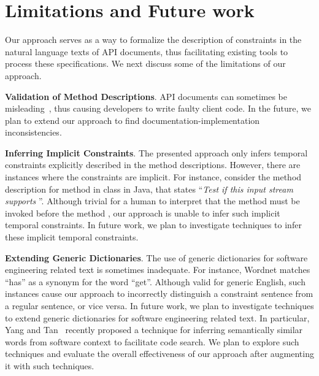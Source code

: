 \section{Limitations and Future work}
\label{sec:discussion}
\vspace*{-1ex}
Our approach serves as a way to formalize the description of constraints in the natural language texts of API documents, thus facilitating existing tools to process these specifications. We next discuss some of the limitations of our approach.

\textbf{Validation of Method Descriptions}. API documents can sometimes be misleading~\cite{tcomment,Cindy10:PASTE}, thus causing developers to write faulty client code. In the future, we plan to extend our approach to find documentation-implementation inconsistencies.

\textbf{Inferring Implicit Constraints}. The presented approach 
only infers temporal constraints explicitly described in the method descriptions.
However, there are instances where the constraints are implicit. For instance, consider the method description for  method in  class in Java, that states ``\textit{Test if this input stream supports }''.
Although trivial for a human to interpret that the method  must be invoked before the method , our approach is unable to infer such implicit temporal constraints.
In future work, we plan to investigate techniques to infer these implicit temporal constraints.

\textbf{Extending Generic Dictionaries}. The use of generic dictionaries for software engineering related text is sometimes inadequate. For instance, Wordnet matches ``has'' as a synonym for the word ``get''. Although valid for generic English, such instances cause our approach to incorrectly distinguish a constraint sentence from a regular sentence, or vice versa. In future work, we plan to investigate techniques to extend generic dictionaries for software engineering related text. In particular, Yang and Tan~\cite{swordnet} recently proposed a technique for inferring semantically similar words from software context to facilitate code search. We plan to explore such techniques and evaluate the overall effectiveness of our approach after augmenting it with such techniques.  

